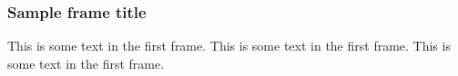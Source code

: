 \documentclass{beamer}
\begin{document}
\maketitle

\begin{frame}
\frametitle{Sample frame title}
This is some text in the first frame. This is some text in the first frame. This is some text in the first frame.
\end{frame}
\end{document}
